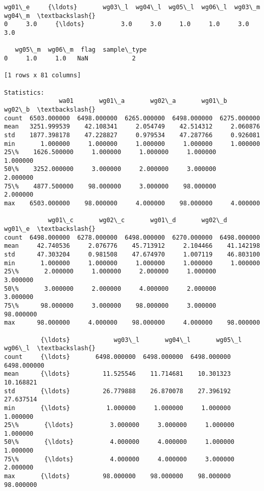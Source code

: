 \documentclass[11pt]{article}
\begin{document}
\begin{Verbatim}[commandchars=\\\{\}]
   wg01\_e     {\ldots}       wg03\_l  wg04\_l  wg05\_l  wg06\_l  wg03\_m  wg04\_m  \textbackslash{}
0     3.0     {\ldots}          3.0     3.0     1.0     1.0     3.0     3.0   

   wg05\_m  wg06\_m  flag  sample\_type  
0     1.0     1.0   NaN            2  

[1 rows x 81 columns]

Statistics: 
               wa01       wg01\_a       wg02\_a       wg01\_b       wg02\_b  \textbackslash{}
count  6503.000000  6498.000000  6265.000000  6498.000000  6275.000000   
mean   3251.999539    42.108341     2.054749    42.514312     2.060876   
std    1877.398178    47.228827     0.979534    47.287766     0.926081   
min       1.000000     1.000000     1.000000     1.000000     1.000000   
25\%    1626.500000     1.000000     1.000000     1.000000     1.000000   
50\%    3252.000000     3.000000     2.000000     3.000000     2.000000   
75\%    4877.500000    98.000000     3.000000    98.000000     2.000000   
max    6503.000000    98.000000     4.000000    98.000000     4.000000   

            wg01\_c       wg02\_c       wg01\_d       wg02\_d       wg01\_e  \textbackslash{}
count  6498.000000  6278.000000  6498.000000  6270.000000  6498.000000   
mean     42.740536     2.076776    45.713912     2.104466    41.142198   
std      47.303204     0.981508    47.674970     1.007119    46.803100   
min       1.000000     1.000000     1.000000     1.000000     1.000000   
25\%       2.000000     1.000000     2.000000     1.000000     3.000000   
50\%       3.000000     2.000000     4.000000     2.000000     3.000000   
75\%      98.000000     3.000000    98.000000     3.000000    98.000000   
max      98.000000     4.000000    98.000000     4.000000    98.000000   

          {\ldots}            wg03\_l       wg04\_l       wg05\_l       wg06\_l  \textbackslash{}
count     {\ldots}       6498.000000  6498.000000  6498.000000  6498.000000   
mean      {\ldots}         11.525546    11.714681    10.301323    10.168821   
std       {\ldots}         26.779888    26.870078    27.396192    27.637514   
min       {\ldots}          1.000000     1.000000     1.000000     1.000000   
25\%       {\ldots}          3.000000     3.000000     1.000000     1.000000   
50\%       {\ldots}          4.000000     4.000000     1.000000     1.000000   
75\%       {\ldots}          4.000000     4.000000     3.000000     2.000000   
max       {\ldots}         98.000000    98.000000    98.000000    98.000000   


\end{Verbatim}
\end{document}
